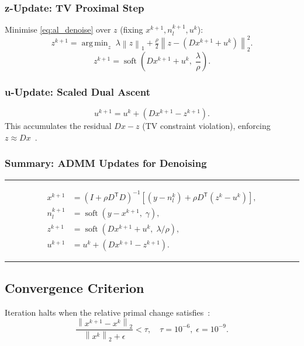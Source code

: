 \documentclass[journal,twoside,10pt]{IEEEtran}
\DeclareMathOperator*{\argmin}{arg\,min}
\newcommand{\norm}[1]{\left\lVert#1\right\rVert}
\newcommand{\T}{^{\mathsf{T}}}
\begin{document}
\subsubsection{\textbf{z}-Update: TV Proximal Step}

Minimise \eqref{eq:al_denoise} over $z$ (fixing $x^{k+1},n_l^{k+1},u^k$):
\begin{equation}
  z^{k+1}=\argmin_z\;\lambda\norm{z}_1+\tfrac{\rho}{2}\norm{z-(Dx^{k+1}+u^k)}_2^2.
\end{equation}
\begin{equation}
  \boxed{z^{k+1}=\operatorname{soft}\!\left(Dx^{k+1}+u^k,\;\frac{\lambda}{\rho}\right).}
  \label{eq:z_update_denoise}
\end{equation}

\subsubsection{\textbf{u}-Update: Scaled Dual Ascent}

\begin{equation}
  \boxed{u^{k+1}=u^k+(Dx^{k+1}-z^{k+1}).}
  \label{eq:u_update_denoise}
\end{equation}
This accumulates the residual $Dx-z$ (TV constraint violation), enforcing $z\approx Dx$~\cite{boyd2011}.

\subsubsection{Summary: ADMM Updates for Denoising}

\noindent\rule{\linewidth}{0.4pt}
\begin{align}
  x^{k+1}&=(I+\rho D\T D)^{-1}[(y-n_l^k)+\rho D\T(z^k-u^k)],\tag{D1}\label{D1}\\
  n_l^{k+1}&=\operatorname{soft}(y-x^{k+1},\;\gamma),\tag{D2}\label{D2}\\
  z^{k+1}&=\operatorname{soft}(Dx^{k+1}+u^k,\;\lambda/\rho),\tag{D3}\label{D3}\\
  u^{k+1}&=u^k+(Dx^{k+1}-z^{k+1}).\tag{D4}\label{D4}
\end{align}
\noindent\rule{\linewidth}{0.4pt}

\subsection{Convergence Criterion}
\label{ssec:convergence}

Iteration halts when the relative primal change satisfies~\cite{boyd2011}:
\begin{equation}
  \frac{\norm{x^{k+1}-x^k}_2}{\norm{x^k}_2+\epsilon} < \tau,
  \quad \tau=10^{-6},\; \epsilon=10^{-9}.
  \label{eq:convergence}
\end{equation}
\end{document}
